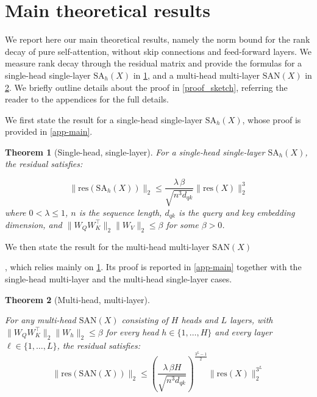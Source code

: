 \documentclass{article}
\theoremstyle{definition}
\theoremstyle{plain}
\newtheorem{theorem}{Theorem}
\begin{document}
{\section{Main {theoretical} results}
\label{theory}

We report here our main {theoretical} results, namely the {norm bound for the} rank decay {of pure self-attention, without skip connections and feed-forward layers.} {We measure rank decay through the {residual} matrix and provide the }formulas for a single-head single-layer {$\mathrm{SA}_h(X)$} in \cref{th:residual}, and a multi-head multi-layer {$\mathrm{SAN}(X)$} in \cref{thm:residual_multiheadlayer}. We briefly outline details about the proof in \cref{proof_sketch}, referring the reader to the appendices for the full details.

We first state the result for a single-head single-layer {$\mathrm{SA}_h(X)$}, whose proof is provided in \cref{app-main}.

\begin{theorem}[Single-head, single-layer]
\label{th:residual}
For a single-head single-layer $\mathrm{SA}_h(X)$, the residual satisfies:

\[
\boxed{
\|\mathrm{res}(\mathrm{SA}{_h}(X))\|_2
\le
\frac{\lambda\, \beta}{\sqrt{n^{3}d_{qk}}}
\|\mathrm{res}(X)\|_2^3 
}
\]
where $0 < \lambda \leq 1$, $n$ is the sequence length, $d_{qk}$ is the query and key embedding dimension, and $\|W_Q W_K^\top\|_2\|W_V\|_2 \le \beta$ for some $\beta > 0$.
\end{theorem}

We then state the result for the multi-head multi-layer $\mathrm{SAN}(X)$}, which relies mainly on \cref{th:residual}. Its proof is reported in \cref{app-main} {together with the single-head multi-layer and the multi-head single-layer cases}.

\begin{theorem}[Multi-head, multi-layer]
\label{thm:residual_multiheadlayer}

For any multi-head $\mathrm{SAN}(X)$ consisting of $H$ heads and $L$ layers, with $\|W_Q W_K^\top\|_2\|W_h\|_2 \le \beta$ for every head $h \in \{1,\dots,H\}$ and every layer $\ell \in \{1,\dots,L\}$, the residual satisfies:
\[
\boxed{
\|\mathrm{res}(\mathrm{SAN}(X))\|_2
\le
\left(
\frac{\lambda\, \beta H}{\sqrt{n^{3}d_{qk}}}
\right)^{\frac{3^L-1}{2}}
\|\mathrm{res}(X)\|_2^{3^L}
}
\]
\end{theorem}
\end{document}
